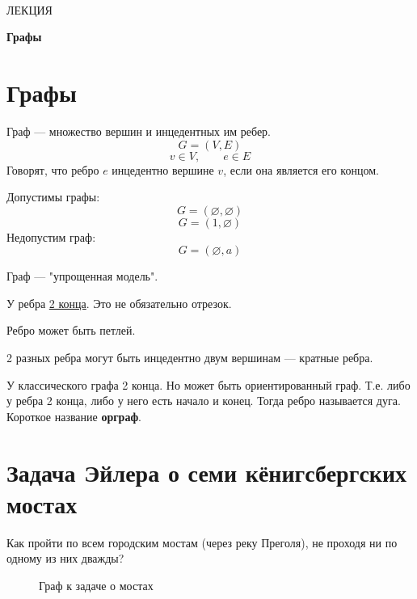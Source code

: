 \documentclass[a4paper,12pt]{article}
\theoremstyle{plain} %
\theoremstyle{definition} %
\theoremstyle{remark} %
\begin{document}
\newcommand{\lec}[1]{\addtocounter{lec}{1} \setcounter{section}{0}%
\begin{center}
{\LARGE ЛЕКЦИЯ %
\vspace{2mm}%

\textbf{#1}%
}
\end{center}
}
\newpage
\
\setcounter{lec}{16}
\lec{Графы}
\section{Графы}
Граф --- множество вершин и инцедентных им ребер.
$$G=(V, E)$$
$$v \in V, \qquad e \in E $$
Говорят, что ребро $e$ инцедентно вершине $v$, если она является его концом.

Допустимы графы:
$$G = (\varnothing, \varnothing)$$
$$G = ({1}, \varnothing)$$
Недопустим граф:
$$G = (\varnothing, {a})$$

Граф --- "упрощенная модель".

У ребра \underline{2 конца}. Это не обязательно отрезок. 

Ребро может быть петлей.

2 разных ребра могут быть инцедентно двум вершинам --- кратные ребра.

У классического графа 2 конца. Но может быть ориентированный граф. Т.е. либо у ребра 2 конца, либо у него есть начало и конец. Тогда ребро называется дуга. Короткое название \textbf{орграф}.

\section{Задача Эйлера о семи кёнигсбергских мостах}
Как пройти по всем городским мостам (через реку Преголя), не проходя ни по одному из них дважды?
\begin{figure}[h!]
	\noindent{}
	\caption{Граф к задаче о мостах}
	\label{fp_2}
	\vspace{-0.5cm}
\end{figure}
\end{document}
